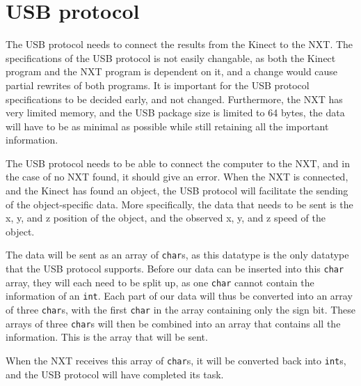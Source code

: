\section{USB protocol}
The USB protocol needs to connect the results from the Kinect to the NXT. The specifications of the USB protocol is not easily changable, as both the Kinect program and the NXT program is dependent on it, and a change would cause partial rewrites of both programs. It is important for the USB protocol specifications to be decided early, and not changed.
Furthermore, the NXT has very limited memory, and the USB package size is limited to 64 bytes, the data will have to be as minimal as possible while still retaining all the important information. 

The USB protocol needs to be able to connect the computer to the NXT, and in the case of no NXT found, it should give an error.
When the NXT is connected, and the Kinect has found an object, the USB protocol will facilitate the sending of the object-specific data.
More specifically, the data that needs to be sent is the x, y, and z position of the object, and the observed x, y, and z speed of the object.

The data will be sent as an array of \texttt{char}s, as this datatype is the only datatype that the USB protocol supports. Before our data can be inserted into this \texttt{char} array, they will each need to be split up, as one \texttt{char} cannot contain the information of an \texttt{int}. Each part of our data will thus be converted into an array of three \texttt{char}s, with the first \texttt{char} in the array containing only the sign bit. These arrays of three \texttt{char}s will then be combined into an array that contains all the information. This is the array that will be sent.

When the NXT receives this array of \texttt{char}s, it will be converted back into \texttt{int}s, and the USB protocol will have completed its task.